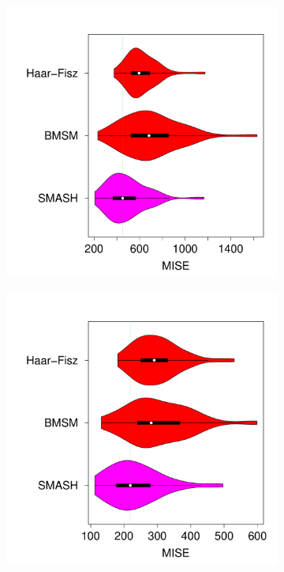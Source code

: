 \documentclass[12pt]{article}
\begin{document}
\begin{figure}
\centering
    \begin{subfigure}[b]{0.45\textwidth}
        \centering
        \includegraphics[width=\textwidth]{violin_pois_1.pdf}
        \caption{}
        \label{fig:pois_1}
    \end{subfigure}
		\hfill
    \begin{subfigure}[b]{0.45\textwidth}
        \centering
        \includegraphics[width=\textwidth]{violin_pois_8.pdf}

\end{subfigure}
\end{figure}
\end{document}

